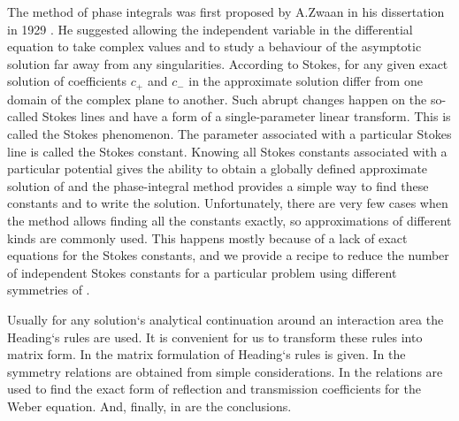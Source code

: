 \documentclass[12pt]{iopart}
\begin{document}
The method of phase integrals was first proposed by A.Zwaan in his dissertation in 1929 \cite{zwaan}. He suggested allowing the independent variable in the differential equation to take complex values and to study a behaviour of the asymptotic solution far away from any singularities. According to Stokes\cite{stokes}, for any given exact solution of  coefficients $c_+$ and $c_-$ 
in the approximate solution  differ from one domain of the complex plane to another. Such abrupt changes happen on the so-called Stokes lines and have a form of a single-parameter linear transform\cite{heading}. This is called the Stokes phenomenon. The parameter associated with a particular Stokes line is called the Stokes constant. Knowing all Stokes constants associated with a particular potential gives the ability to obtain a globally defined approximate solution of \cite{heading,white} and the phase-integral method provides a simple way to find these constants and to write the solution. Unfortunately, there are very few cases when the method allows finding all the constants exactly, so approximations of different kinds \cite{white,ours} are commonly used. This happens mostly because of a lack of exact equations for the Stokes constants, and we provide a recipe to reduce the number of independent Stokes constants for a particular problem using different symmetries of .

Usually for any solution`s analytical continuation around an interaction area 
the Heading`s rules \cite{white} are used. It is convenient for us to transform these rules into matrix form. 
In  the matrix formulation of Heading`s rules is given. 
In  the symmetry relations are obtained from simple considerations. 
In  the relations are used to find the exact form of reflection and transmission coefficients for the Weber equation. 
And, finally, in  are the conclusions. 
\end{document}
